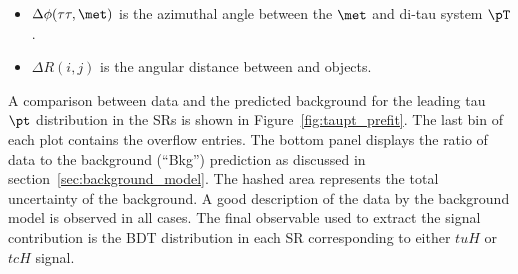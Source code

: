 \begin{itemize}
\item $\Delta\phi(\tau\tau,\met)$ is the azimuthal angle between the $\met$ and di-tau system $\pT$.
\item $\Delta R(i,j)$ is the angular distance between  and  objects. 
\end{itemize}

A comparison between data and the predicted background for the leading tau $\pt$ distribution in the SRs 
is shown in Figure~\ref{fig:taupt_prefit}.
The last bin of each plot contains the overflow entries.
The bottom panel displays the ratio of data to the background (``Bkg'') prediction as discussed in section~\ref{sec:background_model}.
The hashed area represents the total uncertainty of the background.
A good description of the data by the background model is observed in all cases.
The final observable used to extract the signal contribution is the BDT distribution in each SR corresponding to either $tuH$ or $tcH$ signal.

